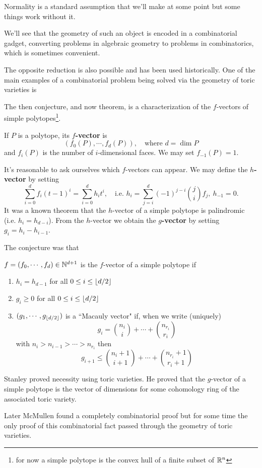 \begin{remark}
Normality is a standard assumption that we'll make at some point but some things work without it.
\end{remark}

We'll see that the geometry of such an object is encoded in a combinatorial gadget, converting problems in algebraic geometry to problems in combinatorics, which is sometimes convenient.

The opposite reduction is also possible and has been used historically. One of the main examples of a combinatorial problem being solved via the geometry of toric varieties is
\begin{example}

The then conjecture, and now theorem, is a characterization of the $f$-vectors of simple polytopes\footnote{for now a simple polytope is the convex hull of a finite subset of $\mathbb{R}^n$}.

\begin{definition}[$f$-vectors]
If $P$ is a polytope, its \textbf{$f$-vector} is 
\[(f_0(P),\cdots, f_d(P)),\quad \text{where $d=\dim P$}\]
and $f_i(P)$ is the number of $i$-dimensional faces. We may set $f_{-1}(P)=1$.
\end{definition}

It's reasonable to ask ourselves which $f$-vectors can appear. We may define the \textbf{$h$-vector} by setting
\[\sum_{i=0}^d f_i (t-1)^i=\sum_{i=0}^dh_i t^i,\quad \text{i.e. }h_i=\sum_{j=i}^d(-1)^{j-i}\binom{j}if_j,\ h_{-1}=0.\]
It was a known theorem that the $h$-vector of a simple polytope is palindromic (i.e. $h_i=h_{d-i}$).
From the $h$-vector we obtain the \textbf{$g$-vector} by setting $g_i=h_i-h_{i-1}$. 

The conjecture was that
\begin{theorem}[$g$-conjecture]
$f=(f_0,\cdots, f_d)\in \mathbb{N}^{d+1}$ is the $f$-vector of a simple polytope if
\begin{enumerate}
\item $h_i=h_{d-1}$ for all $0\leq i\leq \left\lfloor {d/2}\right\rfloor$
\item $g_i\geq 0$ for all $0\leq i\leq \left\lfloor {d/2}\right\rfloor$
\item $(g_1,\cdots, g_{\left\lfloor {d/2}\right\rfloor})$ is a ``Macauly vector" if, when we write (uniquely)
\[g_i=\binom{n_i}i+\cdots+\binom{n_{r_i}}{r_i}\]
with $n_i>n_{i-1}>\cdots>n_{r_i}$ then
\[g_{i+1}\leq \binom{n_i+1}{i+1}+\cdots+\binom{n_{r_i}+1}{r_i+1}\]
\end{enumerate}
\end{theorem}
Stanley proved necessity using toric varieties. He proved that the $g$-vector of a simple polytope is the vector of dimensions for some cohomology ring of the associated toric variety.


Later McMullen found a completely combinatorial proof but for some time the only proof of this combinatorial fact passed through the geometry of toric varieties.
\end{example}